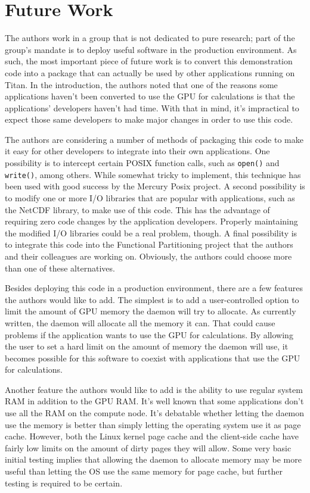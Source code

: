 \section{Future Work}
\label{sec:future}

The authors work in a group that is not dedicated to pure research; part of the group's mandate is to deploy useful software in the production environment.  As such, the most important piece of future work is to convert this demonstration code into a package that can actually be used by other applications running on Titan.  In the introduction, the authors noted that one of the reasons some applications haven't been converted to use the GPU for calculations is that the applications' developers haven't had time.  With that in mind, it's impractical to expect those same developers to make major changes in order to use this code.  

The authors are considering a number of methods of packaging this code to make it easy for other developers to integrate into their own applications.  One possibility is to intercept certain POSIX function calls, such as \texttt{open()} and \texttt{write()}, among others.  While somewhat tricky to implement, this technique has been used with good success by the Mercury Posix project.\cite{mercury_posix_demo}  A second possibility is to modify one or more I/O libraries that are popular with applications, such as the NetCDF library, to make use of this code.  This has the advantage of requiring zero code changes by the application developers.  Properly maintaining the modified I/O libraries could be a real problem, though. A final possibility is to integrate this code into the Functional Partitioning project that the authors and their colleagues are working on.\cite{Li:2010:FPO:1884643.1884686}  Obviously, the authors could choose more than one of these alternatives.


Besides deploying this code in a production environment, there are a few features the authors would like to add.  The simplest is to add a user-controlled option to limit the amount of GPU memory the daemon will try to allocate.  As currently written, the daemon will allocate all the memory it can.  That could cause problems if the application wants to use the GPU for calculations.  By allowing the user to set a hard limit on the amount of memory the daemon will use, it becomes possible for this software to coexist with applications that use the GPU for calculations.

Another feature the authors would like to add is the ability to use regular system RAM in addition to the GPU RAM.  It's well known that some applications don't use all the RAM on the compute node.  It's debatable whether letting the daemon use the memory is better than simply letting the operating system use it as page cache.  However, both the Linux kernel page cache and the client-side cache have fairly low limits on the amount of dirty pages they will allow.  Some very basic initial testing implies that allowing the daemon to allocate memory may be more useful than letting the OS use the same memory for page cache, but further testing is required to be certain.

